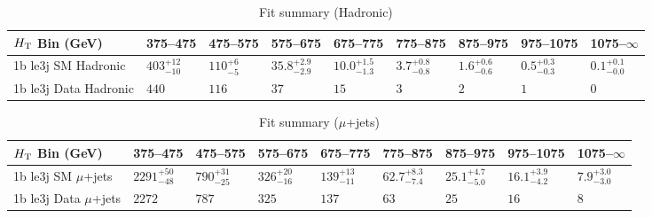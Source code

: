 \documentclass[8pt]{article}
\def\scalht{\mbox{$H_{\rm{T}}$}\xspace}
\newcommand\T{\rule{0pt}{2.6ex}}
\begin{document}
\begin{table}[ht!]
\caption{Fit summary (Hadronic)}
\label{tab:ensemble-summary}
\centering
\begin{tabular}{ lllllllll }

\hline
\scalht Bin (GeV)       & 375--475                       & 475--575                       & 575--675                       & 675--775                       & 775--875                       & 875--975                       & 975--1075                      & 1075--$\infty$                 \\ [1.000000ex]
\hline
1b le3j SM Hadronic\T   & $403^{+12}_{-10}$              & $110^{+6}_{-5}$                & $35.8^{+2.9}_{-2.9}$           & $10.0^{+1.5}_{-1.3}$           & $3.7^{+0.8}_{-0.8}$            & $1.6^{+0.6}_{-0.6}$            & $0.5^{+0.3}_{-0.3}$            & $0.1^{+0.1}_{-0.0}$            \\ 
1b le3j Data Hadronic\T & $440$                          & $116$                          & $37$                           & $15$                           & $3$                            & $2$                            & $1$                            & $0$                            \\ 
\hline

\end{tabular}
\end{table}
\begin{table}[ht!]
\caption{Fit summary ($\mu$+jets)}
\label{tab:ensemble-summary}
\centering
\begin{tabular}{ lllllllll }

\hline
\scalht Bin (GeV)       & 375--475                       & 475--575                       & 575--675                       & 675--775                       & 775--875                       & 875--975                       & 975--1075                      & 1075--$\infty$                 \\ [1.000000ex]
\hline
1b le3j SM $\mu$+jets\T & $2291^{+50}_{-48}$             & $790^{+31}_{-25}$              & $326^{+20}_{-16}$              & $139^{+13}_{-11}$              & $62.7^{+8.3}_{-7.4}$           & $25.1^{+4.7}_{-5.0}$           & $16.1^{+3.9}_{-4.2}$           & $7.9^{+3.0}_{-3.0}$            \\ 
1b le3j Data $\mu$+jets\T & $2272$                         & $787$                          & $325$                          & $137$                          & $63$                           & $25$                           & $16$                           & $8$                            \\ 
\hline

\end{tabular}
\end{table}
\end{document}
